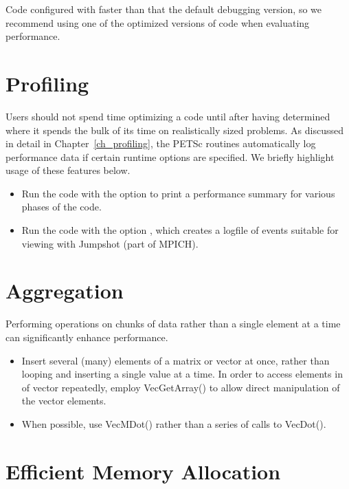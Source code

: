 {{Code configured with 
faster than that the default debugging version, so we recommend using one
of the optimized versions of code when evaluating performance.

\section{Profiling}
  

Users should not spend time optimizing a code until after having determined
where it spends the bulk of its time on realistically sized problems.
As discussed in detail in Chapter~\ref{ch_profiling}, the PETSc
routines automatically log performance data if certain runtime options
are specified.  We briefly highlight usage of these features below.

\begin{itemize}
\item Run the code with the option  to print a performance
   summary for various phases of the code. 

\item Run the code with the option  \trl{[logfilename]}, which creates a
   logfile of events suitable for viewing with Jumpshot (part of
   MPICH). 

\end{itemize}

\section{Aggregation}

Performing operations on chunks of data rather than a single element
at a time can significantly enhance performance.
\begin{itemize}
\item Insert several (many) elements of a matrix or vector at once, rather
   than looping and inserting a single value at a time.  In order to
   access elements in of vector repeatedly, employ {VecGetArray()} to allow
   direct manipulation of the vector elements.

\item When possible, use VecMDot() rather than a series of calls to VecDot().
\end{itemize}

\section{Efficient Memory Allocation}
\label{sec_perf_memory}

}}

